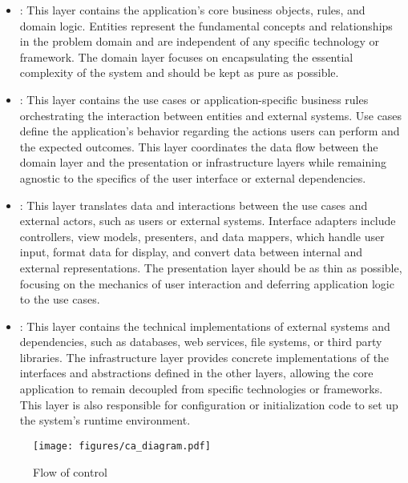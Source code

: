 \begin{itemize} \label{list:layers}
    \item {}: This layer contains the application's core business
    objects, rules, and domain logic. Entities represent the fundamental concepts and
    relationships in the problem domain and are independent of any specific technology
    or framework. The domain layer focuses on encapsulating the essential complexity of
    the system and should be kept as pure as possible.
    \item {}: This layer contains the use cases or
    application-specific business rules orchestrating the interaction between entities and
    external systems. Use cases define the application's behavior regarding the actions
    users can perform and the expected outcomes. This layer coordinates the data flow
    between the domain layer and the presentation or infrastructure layers while remaining
    agnostic to the specifics of the user interface or external dependencies.
    \item {}: This layer translates data and interactions
    between the use cases and external actors, such as users or external systems.
    Interface adapters include controllers, view models, presenters, and data mappers,
    which handle user input, format data for display, and convert data between internal
    and external representations. The presentation layer should be as thin as possible,
    focusing on the mechanics of user interaction and deferring application logic to the
    use cases.
    \item {}: This layer contains the technical
    implementations of external systems and dependencies, such as databases, web services,
    file systems, or third party libraries. The infrastructure layer provides concrete
    implementations of the interfaces and abstractions defined in the other layers,
    allowing the core application to remain decoupled from specific technologies or
    frameworks. This layer is also responsible for configuration or initialization code to
    set up the system's runtime environment.
\end{itemize}

\begin{figure}[H]
    \centering
    \texttt{[image: figures/ca\_diagram.pdf]}
    \caption[Flow of control]{Flow of control}
    \label{fig_modulair_components}
\end{figure}

